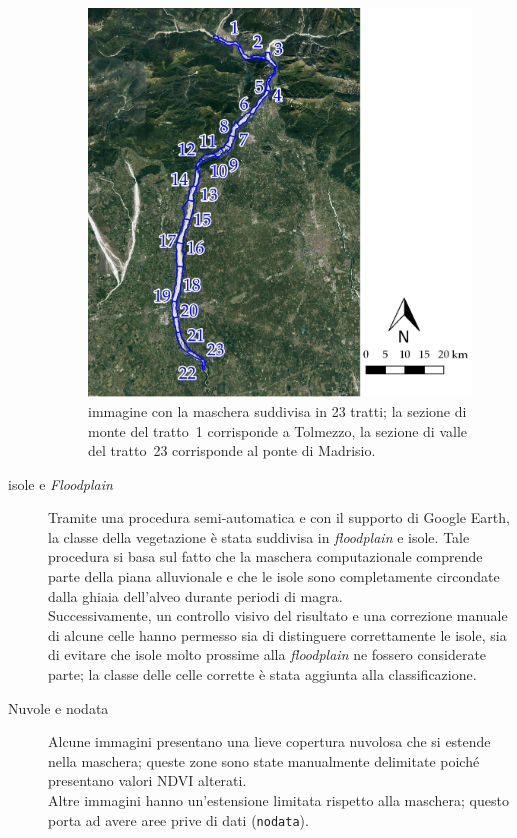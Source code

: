 \begin{description}
	\begin{figure}
		\centering
		\includegraphics[width=.8\textwidth]{files/tutti_23_tratti.jpeg}
		\caption[immagine con la maschera suddivisa in 23 tratti]{immagine con la maschera suddivisa in 23 tratti; la sezione di monte del tratto~1 corrisponde a Tolmezzo, la sezione di valle del tratto~23 corrisponde al ponte di Madrisio.}
		\label{fig:23-tratti}
	\end{figure}
	\item[isole e \emph{Floodplain}]
	Tramite una procedura semi-automatica e con il supporto di Google Earth, la classe della vegetazione è stata suddivisa in \emph{floodplain} e isole. 
	Tale procedura si basa sul fatto che la maschera computazionale comprende parte della piana alluvionale e che le isole sono completamente circondate dalla ghiaia dell'alveo durante periodi di magra.
	\\
	Successivamente, un controllo visivo del risultato e una correzione manuale di alcune celle hanno permesso sia di distinguere correttamente le isole, sia di evitare che isole molto prossime alla \emph{floodplain} ne fossero considerate parte; la classe delle celle corrette è stata aggiunta alla classificazione.
	\item[Nuvole e nodata] Alcune immagini presentano una lieve copertura nuvolosa che si estende nella maschera; queste zone sono state manualmente delimitate poiché presentano valori NDVI alterati.
	\\
	Altre immagini hanno un'estensione limitata rispetto alla maschera; questo porta ad avere aree prive di dati (\texttt{nodata}).

\end{description}
